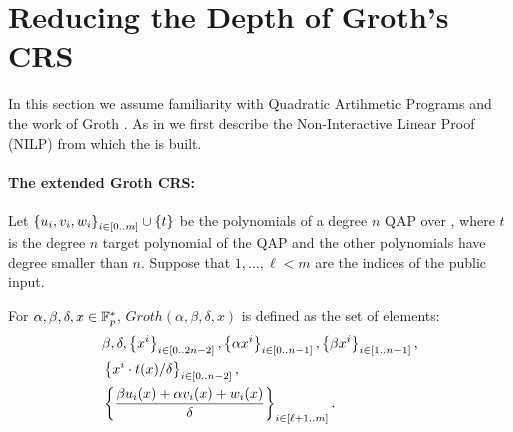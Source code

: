 \documentclass{article}
\begin{document}



\section{Reducing the Depth of Groth's CRS}\label{sec:grothcrs}
% 
% 

\newcommand{\indexedset}[2]{{\sett{#1}{i\in[0..#2]}}}
\newcommand{\indexedsetflex}[2]{\sett{{#1}}{i\in [#2]}}
\newcommand{\summ}{\sum_{i=0}^m}
\newcommand{\sumflex}[2]{\sum_{#1}^{#2}}
\newcommand{\ithcomp}{\beta u_i(x)+\alpha v_i(x) +w_i(x)}
\newcommand{\inppart}{\sumflex{i=0}{\ell}a_i(\ithcomp)}

In this section we assume familiarity with Quadratic Artihmetic Programs \cite{GGPR} and the work of Groth \cite{Groth16}.
As in \cite{Groth16} we first describe the Non-Interactive Linear Proof (NILP) from which the {\snark} is built.
\paragraph{The extended Groth CRS:}
Let $\left\{u_i,v_i,w_i\right\}_{i\in [0..m]}\cup \left\{t\right\}$ be the polynomials of a degree $n$ QAP over \F,
where $t$ is the degree $n$ target polynomial of the QAP and the other polynomials have degree smaller than $n$.
Suppose that $1,\ldots,\ell <m$ are the indices of the public input.

For $\alpha,\beta,\delta,x\in {\mathbb F}_p^*$,
$Groth(\alpha,\beta,\delta,x)$ is defined as the set of elements:
\begin{align*}
&\beta,\delta,\sett{x^i}{i\in[0..2n-2]},\sett{\alpha x^i}{i\in[0..n-1]},\sett{\beta x^i}{i\in[1..n-1]},\\ 
&\sett{x^i\cdot t(x)/\delta}{i\in[0..n-2]},\\
&\indexedsetflex{\frac{\beta u_i(x) + \alpha v_i(x) + w_i(x)}{\delta}}{\ell+1..m}.
\end{align*}
\end{document}
